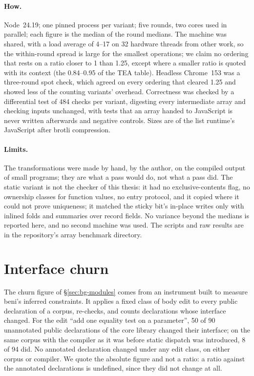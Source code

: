 \paragraph{How.} Node~24.19; one pinned  process per variant; five rounds, two
cores used in parallel; each figure is the median of the round medians. The machine was shared, with a
load average of 4--17 on 32 hardware threads from other work, so the within-round spread is large for the
smallest operations; we claim no ordering that rests on a ratio closer to 1 than 1.25, except where a
smaller ratio is quoted with its context (the 0.84--0.95 of the TEA table). Headless Chrome~153 was a
three-round spot check, which agreed on every ordering that cleared 1.25 and showed less of the counting
variants' overhead. Correctness was checked by a differential test of 484 checks per variant, digesting
every intermediate array and checking inputs unchanged, with tests that an array handed to JavaScript is
never written afterwards and negative controls. Sizes are of the list runtime's JavaScript after brotli
compression.

\paragraph{Limits.} The transformations were made by hand, by the author, on the compiled output of
small programs; they are what a pass would do, not what a pass did. The static variant is not the checker
of this thesis: it had no exclusive-contents flag, no ownership classes for function values, no entry
protocol, and it copied where it could not prove uniqueness; it matched the sticky bit's in-place writes
only with inlined folds and summaries over record fields. No variance beyond the medians is reported
here, and no second machine was used. The scripts and raw results are in the repository's array
benchmark directory.

\section{Interface churn}

The churn figure of \S\ref{sec:bg-modules} comes from an instrument built to measure beni's inferred
 constraints. It applies a fixed class of body edit to every public declaration of a corpus,
re-checks, and counts declarations whose interface changed. For the edit ``add one equality test on a
parameter'', 50 of 90 unannotated public declarations of the core library changed their interface; on the
same corpus with the compiler as it was before static dispatch was introduced, 8 of 94 did. No annotated declaration changed
under any edit class, on either corpus or compiler. We quote the absolute figure and not a ratio: a ratio
against the annotated declarations is undefined, since they did not change at all.

